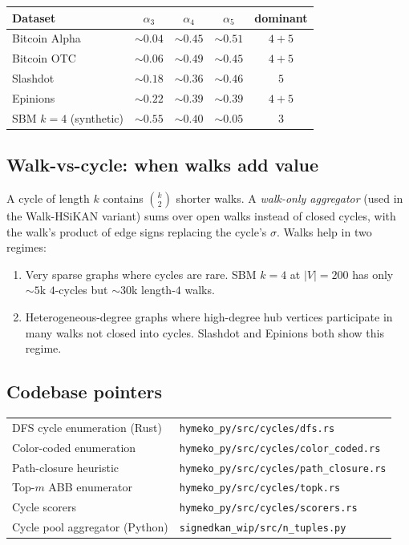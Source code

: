 \documentclass[11pt,a4paper]{article}
\theoremstyle{remark}
\begin{document}
\begin{center}
\begin{tabular}{lcccc}
\toprule
Dataset & $\alpha_3$ & $\alpha_4$ & $\alpha_5$ & dominant \\
\midrule
Bitcoin Alpha & $\sim 0.04$ & $\sim 0.45$ & $\sim 0.51$ & $4 + 5$ \\
Bitcoin OTC   & $\sim 0.06$ & $\sim 0.49$ & $\sim 0.45$ & $4 + 5$ \\
Slashdot      & $\sim 0.18$ & $\sim 0.36$ & $\sim 0.46$ & $5$ \\
Epinions      & $\sim 0.22$ & $\sim 0.39$ & $\sim 0.39$ & $4 + 5$ \\
SBM $k = 4$ (synthetic) & $\sim 0.55$ & $\sim 0.40$ & $\sim 0.05$ & $3$ \\
\bottomrule
\end{tabular}
\end{center}

\subsection{Walk-vs-cycle: when walks add value}

A cycle of length $k$ contains $\binom{k}{2}$ shorter walks. A
\emph{walk-only aggregator} (used in the Walk-HSiKAN variant) sums
over open walks instead of closed cycles, with the walk's product
of edge signs replacing the cycle's $\sigma$. Walks help in two
regimes:

\begin{enumerate}
\item Very sparse graphs where cycles are rare. SBM $k = 4$ at
      $|V| = 200$ has only $\sim 5$k $4$-cycles but $\sim 30$k
      length-$4$ walks.
\item Heterogeneous-degree graphs where high-degree hub vertices
      participate in many walks not closed into cycles. Slashdot
      and Epinions both show this regime.
\end{enumerate}

\subsection{Codebase pointers}

\begin{tabular}{ll}
DFS cycle enumeration (Rust) & \texttt{hymeko\_py/src/cycles/dfs.rs} \\
Color-coded enumeration & \texttt{hymeko\_py/src/cycles/color\_coded.rs} \\
Path-closure heuristic & \texttt{hymeko\_py/src/cycles/path\_closure.rs} \\
Top-$m$ ABB enumerator & \texttt{hymeko\_py/src/cycles/topk.rs} \\
Cycle scorers & \texttt{hymeko\_py/src/cycles/scorers.rs} \\
Cycle pool aggregator (Python) & \texttt{signedkan\_wip/src/n\_tuples.py} \\
\end{tabular}
\end{document}
